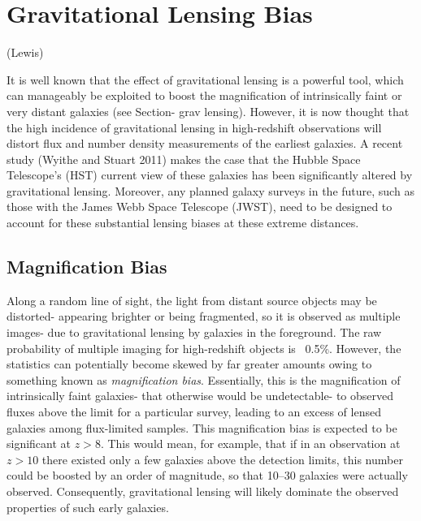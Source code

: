 
\section{Gravitational Lensing Bias} %
\label{sec:gravitational_lensing_bias}
(Lewis)

	It is well known that the effect of gravitational lensing is a powerful tool, which can manageably be exploited to boost the magnification of intrinsically faint or very distant galaxies (see Section- grav lensing). However, it is now thought that the high incidence of gravitational lensing in high-redshift observations will distort flux and number density measurements of the earliest galaxies\cite{distortionsinthegravitationallens}. A recent study (Wyithe and Stuart 2011) makes the case that the Hubble Space Telescope's (HST) current view of these galaxies has been significantly altered by gravitational lensing. Moreover, any planned galaxy surveys in the future, such as those with the James Webb Space Telescope (JWST), need to be designed to account for these substantial lensing biases at these extreme distances\cite{wyithestuart2011}.

	\subsection{Magnification Bias} %
	\label{sub:magnification_bias}
		Along a random line of sight, the light from distant source objects may be distorted- appearing brighter or being fragmented, so it is observed as multiple images- due to gravitational lensing by galaxies in the foreground. The raw probability of multiple imaging for high-redshift objects is ~0.5\%. However, the statistics can potentially become skewed by far greater amounts owing to something known as \emph{magnification bias}. Essentially, this is the magnification of intrinsically faint galaxies- that otherwise would be undetectable- to observed fluxes above the limit for a particular survey, leading to an excess of lensed galaxies among flux-limited samples. This magnification bias is expected to be significant at $z>8$. This would mean, for example, that if in an observation at $z>10$ there existed only a few galaxies above the detection limits, this number could be boosted by an order of magnitude, so that 10--30 galaxies were actually observed\cite{Cosmicmagnifyinglenses}. Consequently, gravitational lensing will likely dominate the observed properties of such early galaxies.

